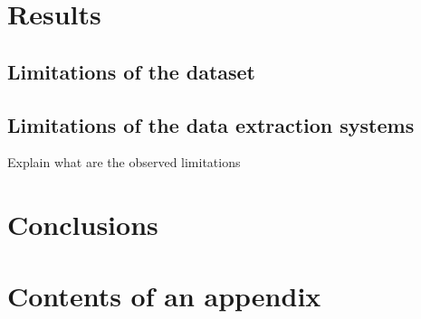 \documentclass[english, 12pt, a4paper, elec, utf8, a-2b, online]{aaltothesis}
\begin{document}
\clearpage
\section{Results}


\subsection{Limitations of the dataset}

\subsection{Limitations of the data extraction systems}

Explain what are the observed limitations

\clearpage

\section{Conclusions}
\label{sec:summary}


\clearpage
\thesisbibliography




\clearpage

\thesisappendix

\section{Contents of an appendix}
\label{app:contents}
\end{document}
